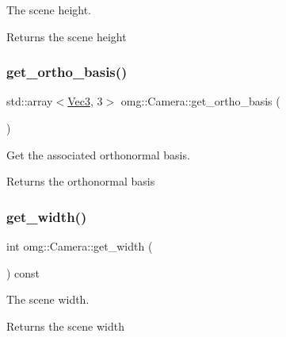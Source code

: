 The scene height. 

\begin{DoxyReturn}{Returns}
the scene height 
\end{DoxyReturn}
\mbox{\label{classomg_1_1_camera_a7bc7168312ae9923904489e792ad0526}} 
\subsubsection{\texorpdfstring{get\_ortho\_basis()}{get\_ortho\_basis()}}
{\footnotesize\ttfamily std\+::array$<$\mbox{\hyperlink{namespaceomg_a45a9482677fee9933ff369b49894e316}{Vec3}}, 3$>$ omg\+::\+Camera\+::get\+\_\+ortho\+\_\+basis (\begin{DoxyParamCaption}{ }\end{DoxyParamCaption})\hspace{0.3cm}{\ttfamily [inline]}}



Get the associated orthonormal basis. 

\begin{DoxyReturn}{Returns}
the orthonormal basis 
\end{DoxyReturn}
\mbox{\label{classomg_1_1_camera_a9d27ce6b9428503ad27e0247deb65bba}} 
\subsubsection{\texorpdfstring{get\_width()}{get\_width()}}
{\footnotesize\ttfamily int omg\+::\+Camera\+::get\+\_\+width (\begin{DoxyParamCaption}{ }\end{DoxyParamCaption}) const\hspace{0.3cm}{\ttfamily [inline]}}



The scene width. 

\begin{DoxyReturn}{Returns}
the scene width 
\end{DoxyReturn}
\mbox{\label{classomg_1_1_camera_a7ad7dd69948685bc74286be8b80968cc}} 
